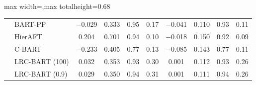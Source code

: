 \begin{table}[htbp]
\begin{adjustbox}{max width=\textwidth,max totalheight=0.68\textheight}
\begin{tabular}{llcccccccc}
& BART-PP & $-$0.029 & 0.333 & 0.95 & 0.17 & $-$0.041 & 0.110 & 0.93 & 0.11 \\
& HierAFT & 0.204 & 0.701 & 0.94 & 0.10 & $-$0.018 & 0.150 & 0.92 & 0.09 \\
& C-BART & $-$0.233 & 0.405 & 0.77 & 0.13 & $-$0.085 & 0.143 & 0.77 & 0.11 \\
& LRC-BART (100) & 0.032 & 0.353 & 0.93 & 0.30 & 0.001 & 0.112 & 0.93 & 0.26 \\
& LRC-BART (0.9) & 0.029 & 0.350 & 0.94 & 0.31 & 0.001 & 0.111 & 0.94 & 0.26 \\
\bottomrule
\end{tabular}
\end{adjustbox}
\end{table}
